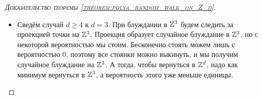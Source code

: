 \documentclass[../main.tex]{subfiles}
\begin{document}
\begin{proof}[\normalfont\textsc{Доказательство теоремы \ref{theorem:polya_random_walk_on_Z_d}}]
\begin{itemize}
\begin{align*}
     &= \frac{\sqrt{2\pi n} \cdot n^{n}e^{-n}}{2 / 3 \cdot \pi n \sqrt{2 / 3 \cdot \pi n} \cdot \frac{n^{n}}{3^{n}} \cdot e^{-n}} = \\
     &= 3^{n} \cdot \frac{3\sqrt 3}{2\pi n}.
    \end{align*} Подставим обратно:
    \begin{align*}
     P(\vec\xi_{2n}=\vec 0) &\leqslant \binom{2n}{n} \frac{3^{n}}{6^{2n}} \max_{i+j \leqslant n} \binom n {i,j,n-i-j} \sim \\
     &\sim \frac{4^{n}}{\sqrt{\pi n}} \cdot \frac{3^{n}}{6^{2n}} \cdot 3^{n} \cdot \frac{3 \sqrt 3}{2\pi n} = \OO \left( \frac{1}{n \sqrt n} \right).
    \end{align*} Значит, ряд вероятностей возврата сходится:
    \begin{align*}
     \sum_{n=0}^{\infty} p_{\vec 0, \vec 0}(n) < +\infty.
    \end{align*} По критерию возвратности (теорема \ref{theorem:back_criteria}) случайное блуждание в $ \Z^{3} $ не возвратно!

   \item Сведём случай $ d \geqslant 4 $ к $ d=3 $. При блуждании в $ \Z^{3} $ будем следить за проекцией точки на $ \Z^{3} $. Проекция образует случайное блуждание в $ \Z^{3} $, но с некоторой вероятностью мы стоим. Бесконечно стоять можем лишь с вероятностью $ 0 $, поэтому все стоянки можно выкинуть, и мы получим случайное блуждание на $ \Z^{3} $. А тогда, чтобы вернуться в $ \mathbb{Z}^{d} $, надо как минимум вернуться в $ \Z^{3} $, а вероятность этого уже меньше единицы.
  \end{itemize}
 \end{proof}
\end{document}
